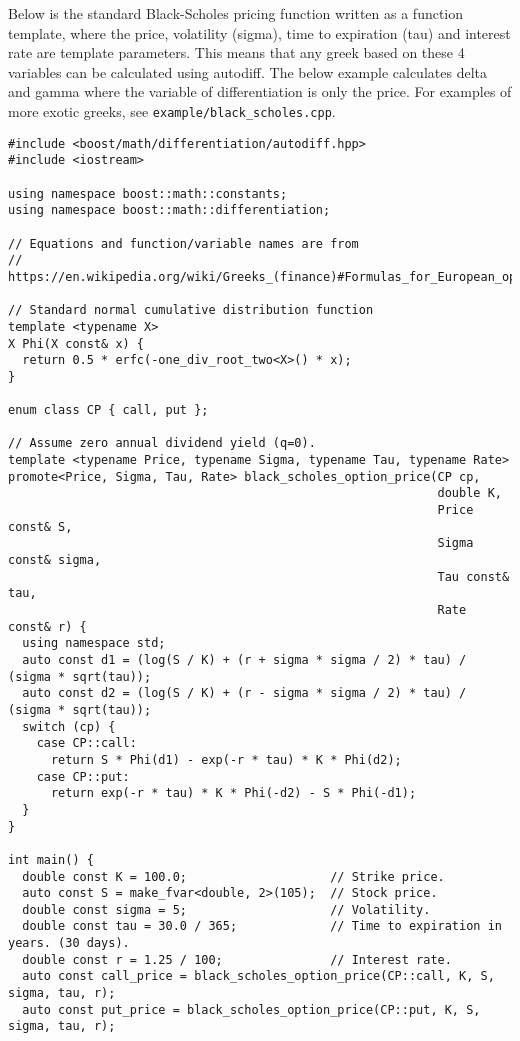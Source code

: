 \documentclass{article}
\begin{document}
Below is the standard Black-Scholes pricing function written as a function template, where the price, volatility
(sigma), time to expiration (tau) and interest rate are template parameters. This means that any greek based on
these 4 variables can be calculated using autodiff. The below example calculates delta and gamma where the variable
of differentiation is only the price. For examples of more exotic greeks, see {\tt example/black\_scholes.cpp}.

\begin{verbatim}
#include <boost/math/differentiation/autodiff.hpp>
#include <iostream>

using namespace boost::math::constants;
using namespace boost::math::differentiation;

// Equations and function/variable names are from
// https://en.wikipedia.org/wiki/Greeks_(finance)#Formulas_for_European_option_Greeks

// Standard normal cumulative distribution function
template <typename X>
X Phi(X const& x) {
  return 0.5 * erfc(-one_div_root_two<X>() * x);
}

enum class CP { call, put };

// Assume zero annual dividend yield (q=0).
template <typename Price, typename Sigma, typename Tau, typename Rate>
promote<Price, Sigma, Tau, Rate> black_scholes_option_price(CP cp,
                                                            double K,
                                                            Price const& S,
                                                            Sigma const& sigma,
                                                            Tau const& tau,
                                                            Rate const& r) {
  using namespace std;
  auto const d1 = (log(S / K) + (r + sigma * sigma / 2) * tau) / (sigma * sqrt(tau));
  auto const d2 = (log(S / K) + (r - sigma * sigma / 2) * tau) / (sigma * sqrt(tau));
  switch (cp) {
    case CP::call:
      return S * Phi(d1) - exp(-r * tau) * K * Phi(d2);
    case CP::put:
      return exp(-r * tau) * K * Phi(-d2) - S * Phi(-d1);
  }
}

int main() {
  double const K = 100.0;                    // Strike price.
  auto const S = make_fvar<double, 2>(105);  // Stock price.
  double const sigma = 5;                    // Volatility.
  double const tau = 30.0 / 365;             // Time to expiration in years. (30 days).
  double const r = 1.25 / 100;               // Interest rate.
  auto const call_price = black_scholes_option_price(CP::call, K, S, sigma, tau, r);
  auto const put_price = black_scholes_option_price(CP::put, K, S, sigma, tau, r);


\end{verbatim}
\end{document}
